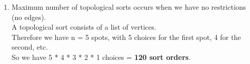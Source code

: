 \documentclass[11pt]{article}
\begin{document}
\begin{enumerate}
    \item
        Maximum number of topological sorts occurs when we have no restrictions (no edges).
        \\
        A topological sort consists of a list of vertices.  \\
        Therefore we have n = 5 spots, with 5 choices for the first spot, 4 for the second, etc. \\
        So we have 5 * 4 * 3 * 2 * 1 choices = \textbf{120 sort orders}. \\
\end{enumerate}
\end{document}
